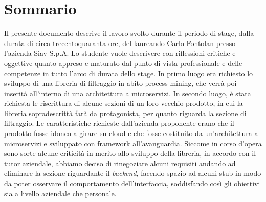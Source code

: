 
\cleardoublepage
{}
{}
\begingroup
\let\clearpage\relax
\let\cleardoublepage\relax
\let\cleardoublepage\relax

\chapter*{Sommario}

Il presente documento descrive il lavoro svolto durante il periodo di stage, dalla durata di circa trecentoquaranta ore, del laureando Carlo Fontolan presso l'azienda Siav S.p.A.
Lo studente vuole descrivere con riflessioni critiche e oggettive quanto appreso e maturato dal punto di vista professionale e delle competenze in tutto l'arco di durata dello stage.
In primo luogo era richiesto lo sviluppo di una libreria di filtraggio in abito process mining, che verrà poi inserità all'interno di una architettura a microservizi.
In secondo luogo, è stata richiesta le riscrittura di alcune sezioni di un loro vecchio prodotto, in cui la libreria sopradescrittà farà da protagonista, per quanto riguarda la sezione di filtraggio. Le caratteristiche richieste dall’azienda proponente erano che il prodotto fosse idoneo a girare su cloud e che fosse costituito da un’architettura a microservizi e sviluppato con framework all'avanguardia.
Siccome in corso d'opera sono sorte alcune criticità in merito allo sviluppo della libreria, in accordo con il tutor aziendale, abbiamo deciso di rinegoziare alcuni requisiti andando ad eliminare la sezione riguardante il  \textit{backend}, facendo spazio ad alcuni stub in modo da poter osservare il comportamento dell'interfaccia, soddisfando così gli obiettivi sia a livello aziendale che personale. 


%
%

\endgroup			

\vfill

